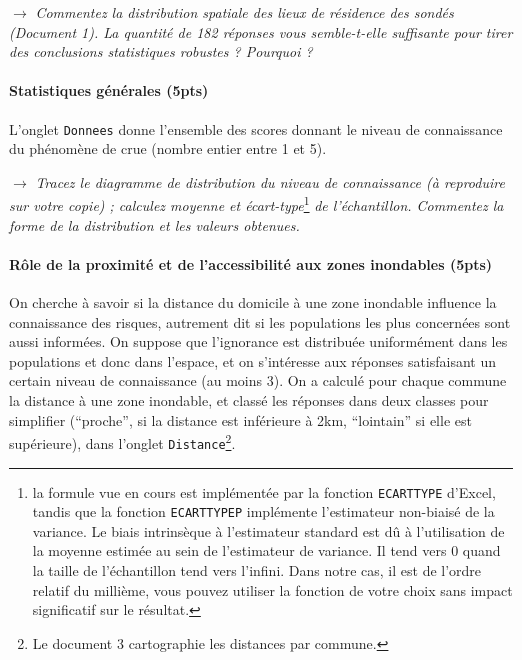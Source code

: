$\rightarrow$ \textit{Commentez la distribution spatiale des lieux de résidence des sondés (Document 1). La quantité de 182 réponses vous semble-t-elle suffisante pour tirer des conclusions statistiques robustes ? Pourquoi ?}






\paragraph{Statistiques générales (5pts)}

L'onglet \texttt{Donnees} donne l'ensemble des scores donnant le niveau de connaissance du phénomène de crue (nombre entier entre 1 et 5).

$\rightarrow$ \textit{Tracez le diagramme de distribution du niveau de connaissance (à reproduire sur votre copie) ; calculez moyenne et écart-type}\footnote{la formule vue en cours est implémentée par la fonction \texttt{ECARTTYPE} d'Excel\textregistered, tandis que la fonction \texttt{ECARTTYPEP} implémente l'estimateur non-biaisé de la variance. Le biais intrinsèque à l'estimateur standard est dû à l'utilisation de la moyenne estimée au sein de l'estimateur de variance. Il tend vers 0 quand la taille de l'échantillon tend vers l'infini. Dans notre cas, il est de l'ordre relatif du millième, vous pouvez utiliser la fonction de votre choix sans impact significatif sur le résultat.}\textit{ de l'échantillon. Commentez la forme de la distribution et les valeurs obtenues.}


\paragraph{Rôle de la proximité et de l'accessibilité aux zones inondables (5pts)}

On cherche à savoir si la distance du domicile à une zone inondable influence la connaissance des risques, autrement dit si les populations les plus concernées sont aussi informées. On suppose que l'ignorance est distribuée uniformément dans les populations et donc dans l'espace, et on s'intéresse aux réponses satisfaisant un certain niveau de connaissance (au moins 3). On a calculé pour chaque commune la distance à une zone inondable, et classé les réponses dans deux classes pour simplifier (``proche'', si la distance est inférieure à 2km, ``lointain'' si elle est supérieure), dans l'onglet \texttt{Distance}\footnote{Le document 3 cartographie les distances par commune.}.

